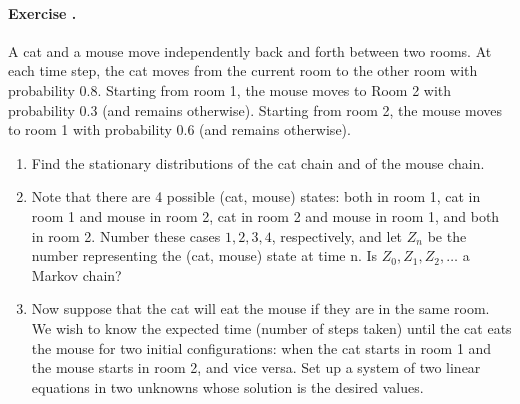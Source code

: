 \documentclass[12pt,a4paper]{article}
\newcounter{num}  %
\begin{document}
\paragraph{Exercise \thenum.}
A cat and a mouse move independently back and forth between two rooms. At each
time step, the cat moves from the current room to the other room with probability 0.8.
Starting from room 1, the mouse moves to Room 2 with probability 0.3 (and remains
otherwise). Starting from room 2, the mouse moves to room 1 with probability 0.6 (and
remains otherwise).
\begin{enumerate}
	\item Find the stationary distributions of the cat chain and of the mouse chain.
	\item Note that there are 4 possible (cat, mouse) states: both in room 1, cat in room
	1 and mouse in room 2, cat in room 2 and mouse in room 1, and both in room 2.
	Number these cases $1, 2, 3, 4$, respectively, and let $Z_n$ be the number representing the
	(cat, mouse) state at time n. Is $Z_0, Z_1, Z_2,\ldots$ a Markov chain?
	\item Now suppose that the cat will eat the mouse if they are in the same room. 
	We wish to know the expected time (number of steps taken) until the cat eats the mouse for two initial configurations: when the cat starts in room 1 and the mouse starts in room 2, and vice versa. 
	Set up a system of two linear equations in two unknowns whose solution is the desired values.
\end{enumerate}
\end{document}
